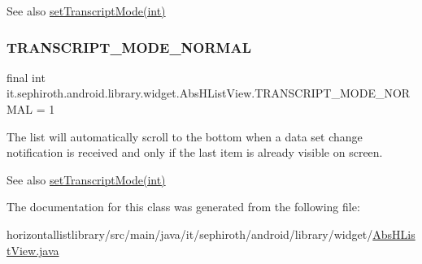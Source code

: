 \begin{DoxySeeAlso}{See also}
\hyperlink{classit_1_1sephiroth_1_1android_1_1library_1_1widget_1_1_abs_h_list_view_a8b67a85811d964b7e821ac0f18894381}{set\+Transcript\+Mode(int)} 
\end{DoxySeeAlso}
\mbox{\label{classit_1_1sephiroth_1_1android_1_1library_1_1widget_1_1_abs_h_list_view_a25b0476067d7722fd323bd283c96cdca}} 
\subsubsection{\texorpdfstring{T\+R\+A\+N\+S\+C\+R\+I\+P\+T\+\_\+\+M\+O\+D\+E\+\_\+\+N\+O\+R\+M\+AL}{TRANSCRIPT\_MODE\_NORMAL}}
{\footnotesize\ttfamily final int it.\+sephiroth.\+android.\+library.\+widget.\+Abs\+H\+List\+View.\+T\+R\+A\+N\+S\+C\+R\+I\+P\+T\+\_\+\+M\+O\+D\+E\+\_\+\+N\+O\+R\+M\+AL = 1\hspace{0.3cm}{\ttfamily [static]}}

The list will automatically scroll to the bottom when a data set change notification is received and only if the last item is already visible on screen.

\begin{DoxySeeAlso}{See also}
\hyperlink{classit_1_1sephiroth_1_1android_1_1library_1_1widget_1_1_abs_h_list_view_a8b67a85811d964b7e821ac0f18894381}{set\+Transcript\+Mode(int)} 
\end{DoxySeeAlso}


The documentation for this class was generated from the following file\+:\begin{DoxyCompactItemize}
\item 
horizontallistlibrary/src/main/java/it/sephiroth/android/library/widget/\hyperlink{_abs_h_list_view_8java}{Abs\+H\+List\+View.\+java}\end{DoxyCompactItemize}

